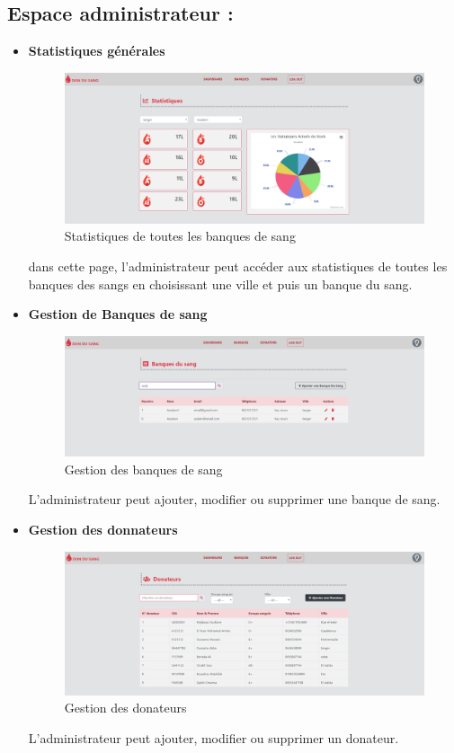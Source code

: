 \documentclass[12pt,a4paper,twoside]{report}
\begin{document}
{		\subsection{Espace administrateur :}{
			\begin{itemize}
					\item \textbf{Statistiques générales}
					\begin{figure}[H]
									 \includegraphics[width=13cm]{Images/statAd.png}
									 \centering
									 \caption{\label{statAd} Statistiques de toutes les banques de sang}
								\end{figure}
								dans cette page, l'administrateur peut accéder aux statistiques de toutes les banques des sangs en choisissant une ville et puis un banque du sang.
					\newline
					\item \textbf{Gestion de Banques de sang}
					\begin{figure}[H]
									 \includegraphics[width=13cm]{Images/bs.png}
									 \centering
									 \caption{\label{bs} Gestion des banques de sang}
								\end{figure}
								L'administrateur peut ajouter, modifier ou supprimer une banque de sang.
					\newline
					\item \textbf{Gestion des donnateurs}
					\begin{figure}[H]
									 \includegraphics[width=13cm]{Images/dn.png}
									 \centering
									 \caption{\label{dn} Gestion des donateurs}
								\end{figure}
								L'administrateur peut ajouter, modifier ou supprimer un donateur.
			\end{itemize}
		}
}
\end{document}
